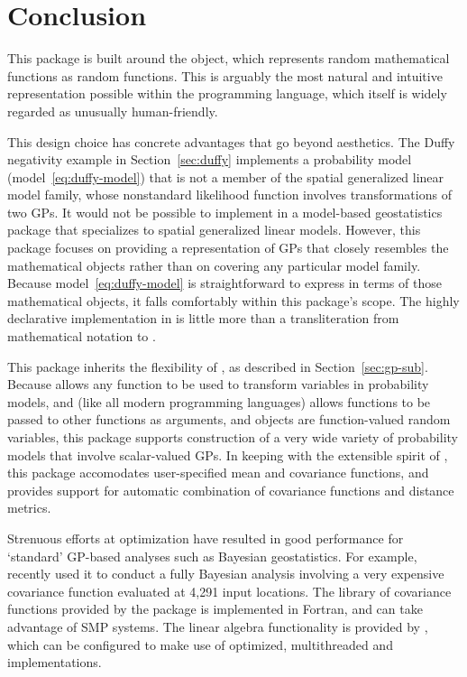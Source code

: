 \documentclass[article]{jss}
\begin{document}
\section{Conclusion}

This package is built around the  object, which represents random mathematical functions as random  functions. This is arguably the most natural and intuitive representation possible within the  programming language, which itself is widely regarded as unusually human-friendly. 

This design choice has concrete advantages that go beyond aesthetics. The Duffy negativity example in Section~\ref{sec:duffy} implements a probability model (model~\ref{eq:duffy-model}) that is not a member of the spatial generalized linear model family, whose nonstandard likelihood function involves transformations of two GPs. It would not be possible to implement in a model-based geostatistics package that specializes to spatial generalized linear models. However, this package focuses on providing a  representation of GPs that closely resembles the mathematical objects rather than on covering any particular model family. Because model~\ref{eq:duffy-model} is straightforward to express in terms of those mathematical objects, it falls comfortably within this package's scope. The highly declarative implementation in  is little more than a transliteration from mathematical notation to . 

This package inherits the flexibility of , as described in Section~\ref{sec:gp-sub}. Because  allows any  function to be used to transform variables in probability models, and  (like all modern programming languages) allows functions to be passed to other functions as arguments, and  objects are function-valued random variables, this package supports construction of a very wide variety of probability models that involve scalar-valued GPs. In keeping with the extensible spirit of , this package accomodates user-specified mean and covariance functions, and provides support for automatic combination of covariance functions and distance metrics.

Strenuous efforts at optimization have resulted in good performance for `standard' GP-based analyses such as Bayesian geostatistics. For example, \cite{map} recently used it to conduct a fully Bayesian analysis involving a very expensive covariance function evaluated at 4,291 input locations. The library of covariance functions provided by the package is implemented in Fortran, and can take advantage of SMP systems. The linear algebra functionality is provided by , which can be configured to make use of optimized, multithreaded  \citep{blas} and  \citep{lapack}  implementations. 
\end{document}
